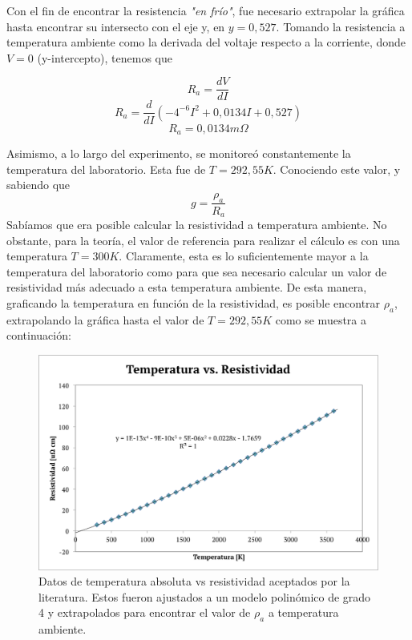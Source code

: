 \documentclass[%
 reprint,
 amsmath,amssymb,
 aps,
]{revtex4-1}
\begin{document}
Con el fin de encontrar la resistencia \textit{"en frío"}, fue necesario extrapolar la gráfica hasta encontrar su intersecto con el eje y, en $y = 0,527$. Tomando la resistencia a temperatura ambiente como la derivada del voltaje respecto a la corriente, donde $V = 0$ (y-intercepto), tenemos que 

\begin{equation}
     R_{a} = \frac{dV}{dI}
\end{equation}
\begin{equation*}
    R_{a} = \frac{d}{dI}(-4^{-6}I^2 + 0,0134I + 0,527)
\end{equation*}
\begin{equation}
      R_{a} = 0,0134 m \Omega
\end{equation}
 
Asimismo, a lo largo del experimento, se monitoreó constantemente la temperatura del laboratorio. Esta fue de $T = 292,55 K$. Conociendo este valor, y sabiendo que
\begin{equation}
    g = \frac{\rho_{a}}{R_{a}}
\end{equation}
Sabíamos que era posible calcular la resistividad a temperatura ambiente. No obstante, para la teoría, el valor de referencia para realizar el cálculo es con una temperatura $T = 300 K$. Claramente, esta es lo suficientemente mayor a la temperatura del laboratorio como para que sea necesario calcular un valor de resistividad más adecuado a esta temperatura ambiente. De esta manera, graficando la temperatura en función de la resistividad, es posible encontrar $\rho_{a}$, extrapolando la gráfica hasta el valor de $T = 292,55 K$ como se muestra a continuación:
\begin{figure}[H]
    \centering
    \includegraphics[scale= 0.35]{temperaturavsresistividad.png}
    \caption{Datos de temperatura absoluta vs resistividad aceptados por la literatura. Estos fueron ajustados a un modelo polinómico de grado 4 y extrapolados para encontrar el valor de $\rho_{a}$ a temperatura ambiente.}
    \label{fig:Figura 5}
\end{figure}
\end{document}
